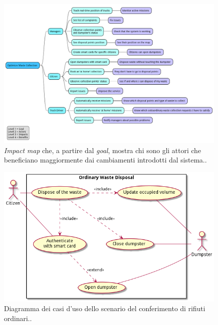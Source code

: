 \begin{figure}[H]
    \centering
    \includegraphics[width=\textwidth]{../img/benefit-mapping.pm}
    \caption{\textit{Impact map} che, a partire dal \textit{goal}, mostra chi sono gli attori che beneficiano maggiormente dai cambiamenti introdotti dal sistema..}
    \label{fig:benefit-mapping}
\end{figure}

\begin{figure}[H]
    \centering
    \includegraphics[width=\textwidth]{../img/ordinary-disposal-use-cases.pm}
    \caption{Diagramma dei casi d'uso dello scenario del conferimento di rifiuti ordinari..}
    \label{fig:ordinary-disposal-use-cases}
\end{figure}

